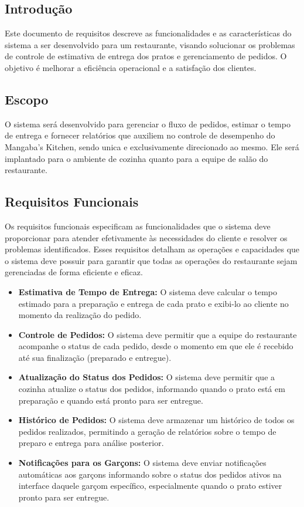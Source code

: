 \hspace{4.5mm}
\subsection{Introdução}
Este documento de requisitos descreve as funcionalidades e as características do sistema a ser desenvolvido para um restaurante, visando solucionar os problemas de controle de estimativa de entrega dos pratos e gerenciamento de pedidos. O objetivo é melhorar a eficiência operacional e a satisfação dos clientes.

\subsection{Escopo}
O sistema será desenvolvido para gerenciar o fluxo de pedidos, estimar o tempo de entrega e fornecer relatórios que auxiliem no controle de desempenho do Mangaba's Kitchen, sendo unica e exclusivamente direcionado ao mesmo. Ele será implantado para o ambiente de cozinha quanto para a equipe de salão do restaurante.

\subsection{Requisitos Funcionais}
Os requisitos funcionais especificam as funcionalidades que o sistema deve proporcionar para atender efetivamente às necessidades do cliente e resolver os problemas identificados. Esses requisitos detalham as operações e capacidades que o sistema deve possuir para garantir que todas as operações do restaurante sejam gerenciadas de forma eficiente e eficaz.

\begin{itemize}
    \item \textbf{Estimativa de Tempo de Entrega:} O sistema deve calcular o tempo estimado para a preparação e entrega de cada prato e exibi-lo ao cliente no momento da realização do pedido.
    
    \item \textbf{Controle de Pedidos:} O sistema deve permitir que a equipe do restaurante acompanhe o status de cada pedido, desde o momento em que ele é recebido até sua finalização (preparado e entregue).
    
    \item \textbf{Atualização do Status dos Pedidos:} O sistema deve permitir que a cozinha atualize o status dos pedidos, informando quando o prato está em preparação e quando está pronto para ser entregue.
    
    \item \textbf{Histórico de Pedidos:} O sistema deve armazenar um histórico de todos os pedidos realizados, permitindo a geração de relatórios sobre o tempo de preparo e entrega para análise posterior.
    
    \item \textbf{Notificações para os Garçons:} O sistema deve enviar notificações automáticas aos garçons informando sobre o status dos pedidos ativos na interface daquele garçom específico, especialmente quando o prato estiver pronto para ser entregue.
\end{itemize}

